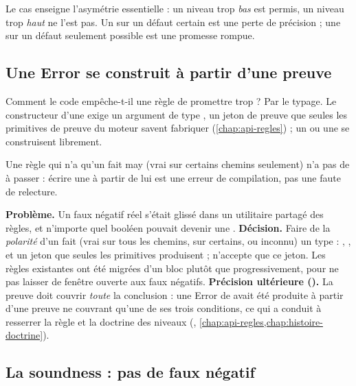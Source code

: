 Le cas  enseigne l'asymétrie essentielle : un niveau trop
\emph{bas} est permis, un niveau trop \emph{haut} ne l'est pas. Un \Warning{}
sur un défaut certain est une perte de précision ; une \Error{} sur un défaut
seulement possible est une promesse rompue.

\subsection{Une Error se construit à partir d'une preuve}

Comment le code empêche-t-il une règle de promettre trop ? Par le typage. Le
constructeur d'une \Error{} exige un argument de type ,
un \og jeton de preuve\fg{} que seules les primitives de preuve du moteur
savent fabriquer (\cref{chap:api-regles}) ; un \Warning{} ou une \Info{} se
construisent librement.


Une règle qui n'a qu'un fait may (vrai sur certains chemins seulement) n'a
pas de  à passer : écrire une \Error{} à partir de lui est une
erreur de compilation, pas une faute de relecture.

\begin{decision}[ADR-021]
  \textbf{Problème.} Un faux négatif réel s'était glissé dans un utilitaire
  partagé des règles, et n'importe quel booléen pouvait devenir une
  . \textbf{Décision.} Faire de la \emph{polarité}
  d'un fait (vrai sur tous les chemins, sur certains, ou inconnu) un type :
  , , et un jeton  que seules les
  primitives  produisent ;  n'accepte que
  ce jeton. Les règles existantes ont été migrées d'un bloc plutôt que
  progressivement, pour ne pas laisser de fenêtre ouverte aux faux négatifs.
  \textbf{Précision ultérieure ().} La preuve doit couvrir
  \emph{toute} la conclusion : une Error de  avait été
  produite à partir d'une preuve ne couvrant qu'une de ses trois conditions,
  ce qui a conduit à resserrer la règle et la doctrine des niveaux
  (, \cref{chap:api-regles,chap:histoire-doctrine}).
\end{decision}

\subsection{La soundness : pas de faux négatif}

